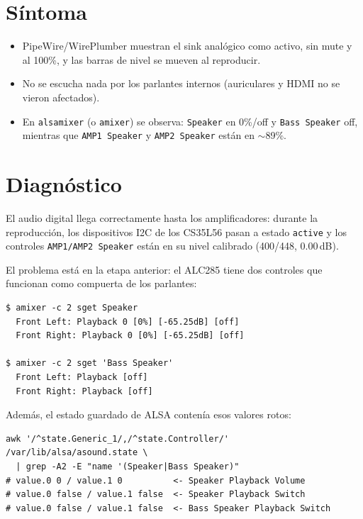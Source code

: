 \documentclass[12pt,a4paper]{article}
\begin{document}
\section{Síntoma}

\begin{itemize}[nosep]
  \item PipeWire/WirePlumber muestran el sink analógico como activo, sin mute y
        al 100\%, y las barras de nivel se mueven al reproducir.
  \item No se escucha nada por los parlantes internos (auriculares y HDMI no
        se vieron afectados).
  \item En \texttt{alsamixer} (o \texttt{amixer}) se observa:
        \texttt{Speaker} en 0\%/off y \texttt{Bass Speaker} off, mientras que
        \texttt{AMP1 Speaker} y \texttt{AMP2 Speaker} están en $\sim$89\%.
\end{itemize}

\section{Diagnóstico}

El audio digital llega correctamente hasta los amplificadores: durante la
reproducción, los dispositivos I2C de los CS35L56 pasan a estado
\texttt{active} y los controles \texttt{AMP1/AMP2 Speaker} están en su nivel
calibrado (400/448, 0.00\,dB).

El problema está en la etapa anterior: el ALC285 tiene dos controles que
funcionan como compuerta de los parlantes:

\begin{lstlisting}[style=bash]
$ amixer -c 2 sget Speaker
  Front Left: Playback 0 [0%] [-65.25dB] [off]
  Front Right: Playback 0 [0%] [-65.25dB] [off]

$ amixer -c 2 sget 'Bass Speaker'
  Front Left: Playback [off]
  Front Right: Playback [off]
\end{lstlisting}

Además, el estado guardado de ALSA contenía esos valores rotos:

\begin{lstlisting}[style=bash]
awk '/^state.Generic_1/,/^state.Controller/' /var/lib/alsa/asound.state \
  | grep -A2 -E "name '(Speaker|Bass Speaker)"
# value.0 0 / value.1 0          <- Speaker Playback Volume
# value.0 false / value.1 false  <- Speaker Playback Switch
# value.0 false / value.1 false  <- Bass Speaker Playback Switch
\end{lstlisting}
\end{document}
